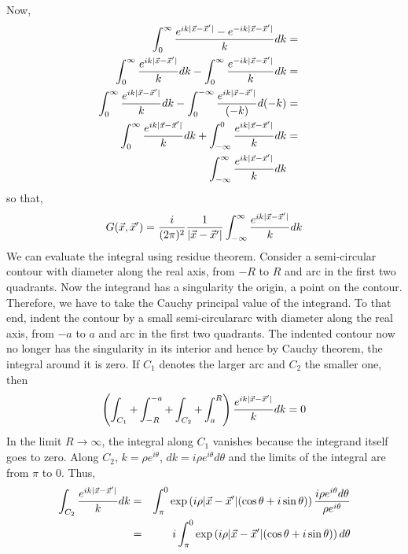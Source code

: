 Now,
\begin{eqnarray*}
\int_{0}^{\infty} \frac{e^{ik|\vec{x}-\vec{x}^\prime|} - e^{-ik|\vec{x}-\vec{x}^\prime|}}{k} dk &=& \\
\int_{0}^{\infty} \frac{e^{ik|\vec{x}-\vec{x}^\prime|}}{k} dk - \int_{0}^{\infty} \frac{e^{-ik|\vec{x}-\vec{x}^\prime|}}{k} dk &=& \\
\int_{0}^{\infty} \frac{e^{ik|\vec{x}-\vec{x}^\prime|}}{k} dk - \int_{0}^{-\infty} \frac{e^{ik|\vec{x}-\vec{x}^\prime|}}{(-k)} d(-k) &=& \\
\int_{0}^{\infty} \frac{e^{ik|\vec{x}-\vec{x}^\prime|}}{k} dk + \int_{-\infty}^{0} \frac{e^{ik|\vec{x}-\vec{x}^\prime|}}{k} dk &=& \\
\int_{-\infty}^{\infty} \frac{e^{ik|\vec{x}-\vec{x}^\prime|}}{k} dk
\end{eqnarray*}
so that,
\begin{equation}\label{c2sae4}
G(\vec{x}, \vec{x}^\prime) = \frac{i}{(2\pi)^{2}}\frac{1}{|\vec{x}-\vec{x}^\prime|}\int_{-\infty}^{\infty} \frac{e^{ik|\vec{x}-\vec{x}^\prime|}}{k} dk
\end{equation}
We can evaluate the integral using residue theorem. Consider a semi-circular contour with diameter along the real axis, from $-R$ to $R$ and arc in the first two quadrants. Now the
integrand has a singularity the origin, a point on the contour. Therefore, we have to take the Cauchy principal value of the integrand. To that end, indent the contour by a small 
semi-circulararc with diameter along the real axis, from $-a$ to $a$ and arc in the first two quadrants. The indented contour now no longer has the singularity in its interior and
hence by Cauchy theorem, the integral around it is zero. If $C_1$ denotes the larger arc and $C_2$ the smaller one, then
\begin{equation}\label{c2sae5}
\left(\int_{C_1} + \int_{-R}^{-a} + \int_{C_2} + \int_{a}^R\right)\frac{e^{ik|\vec{x}-\vec{x}^\prime|}}{k} dk = 0
\end{equation}
In the limit $R \rightarrow \infty$, the integral along $C_1$ vanishes because the integrand itself goes to zero. Along $C_2$, $k = \rho e^{i\theta}$, $dk = i\rho e^{i\theta}d\theta$ and
the limits of the integral are from $\pi$ to $0$. Thus,
\begin{eqnarray*}
\int_{C_2}\frac{e^{ik|\vec{x}-\vec{x}^\prime|}}{k} dk &=& \int_{\pi}^0 \exp\left(i\rho|\vec{x}-\vec{x}^\prime|(\cos\theta+i\sin\theta)\right)\frac{i\rho e^{i\theta}d\theta}{\rho e^{i\theta}} \\
 &=& i\int_{\pi}^0 \exp\left(i\rho|\vec{x}-\vec{x}^\prime|(\cos\theta+i\sin\theta)\right) d\theta
\end{eqnarray*}
